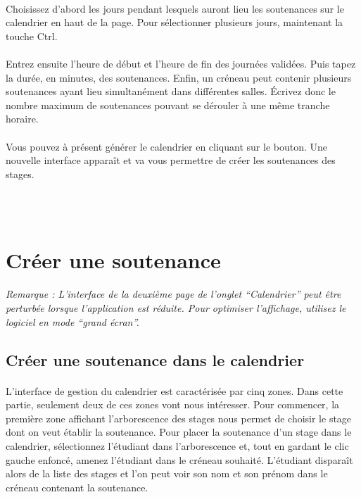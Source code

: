 \documentclass[a4paper,10pt]{book}
\begin{document}
      \paragraph{}
	Choisissez d'abord les jours pendant lesquels auront lieu les soutenances sur le calendrier en haut de la page.
	Pour sélectionner plusieurs jours, maintenant la touche Ctrl.
      
      \paragraph{}
	Entrez ensuite l'heure de début et l'heure de fin des journées validées.
	Puis tapez la durée, en minutes, des soutenances.
	Enfin, un créneau peut contenir plusieurs soutenances ayant lieu simultanément dans différentes salles.
	Écrivez donc le nombre maximum de soutenances pouvant se dérouler à une même tranche horaire.
      
      \paragraph{}
	Vous pouvez à présent générer le calendrier en cliquant sur le bouton.
	Une nouvelle interface apparaît et va vous permettre de créer les soutenances des stages.
      
      ~\\~\\
    \section{Créer une soutenance}
    
	\paragraph{}
	  \textit{Remarque : L'interface de la deuxième page de l'onglet ``Calendrier'' peut être perturbée lorsque l'application est réduite. Pour optimiser l'affichage, utilisez le logiciel en mode ``grand écran''.}
    
      \subsection{Créer une soutenance dans le calendrier}
	\paragraph{}
	  L'interface de gestion du calendrier est caractérisée par cinq zones.
	  Dans cette partie, seulement deux de ces zones vont nous intéresser.
	  Pour commencer, la première zone affichant l'arborescence des stages nous permet de choisir le stage dont on veut établir la soutenance.
	  Pour placer la soutenance d'un stage dans le calendrier, sélectionnez l'étudiant dans l'arborescence et, tout en gardant le clic gauche enfoncé, amenez l'étudiant dans le créneau souhaité.
	  L'étudiant disparaît alors de la liste des stages et l'on peut voir son nom et son prénom dans le créneau contenant la soutenance.
	  
\end{document}
